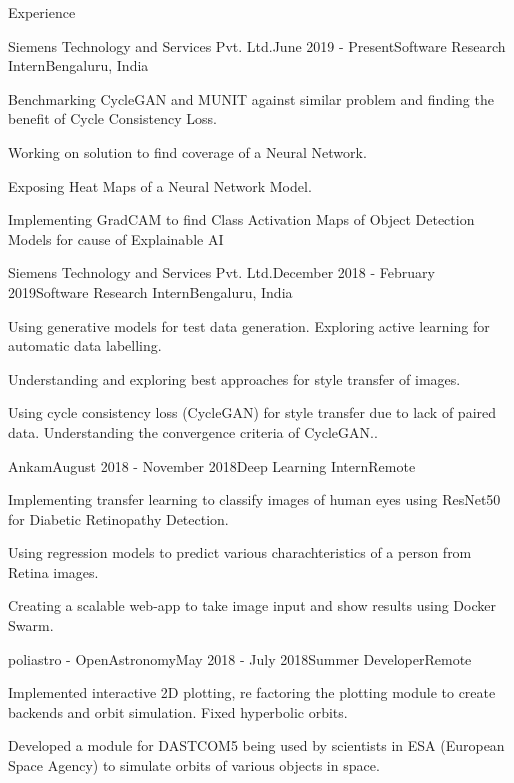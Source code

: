 \documentclass{resume} %
\begin{document}
\begin{rSection}{Experience}

\begin{rSubsection}{Siemens Technology and Services Pvt. Ltd.}{June 2019 - Present}{Software Research Intern}{Bengaluru, India}
\item Benchmarking CycleGAN and MUNIT against similar problem and finding the benefit of Cycle Consistency Loss.
\item Working on solution to find coverage of a Neural Network.
\item Exposing Heat Maps of a Neural Network Model.
\item Implementing GradCAM to find Class Activation Maps of Object Detection Models for cause of Explainable AI
\end{rSubsection}


\begin{rSubsection}{Siemens Technology and Services Pvt. Ltd.}{December 2018 - February 2019}{Software Research Intern}{Bengaluru, India}
\item Using generative models for test data generation. Exploring active learning
for automatic data labelling.
\item Understanding and exploring best approaches for style transfer of images.
\item Using cycle consistency loss (CycleGAN) for style transfer due to lack of paired data. Understanding the convergence criteria of CycleGAN..
\end{rSubsection}


\begin{rSubsection}{Ankam}{August 2018 - November 2018}{Deep Learning Intern}{Remote}
\item Implementing transfer learning to classify images of human eyes using
ResNet50 for Diabetic Retinopathy Detection.
\item Using regression models to predict various charachteristics of a person from Retina images. 
\item Creating a scalable web-app to take image input and show results using Docker Swarm.
\end{rSubsection}


\begin{rSubsection}{poliastro - OpenAstronomy}{May 2018 - July 2018}{Summer Developer}{Remote}
\item Implemented interactive 2D plotting, re factoring the plotting module to
create backends and orbit simulation. Fixed hyperbolic orbits.
\item Developed a module for DASTCOM5 being used by scientists in ESA (European Space Agency) to simulate orbits of various objects in space.
\end{rSubsection}

\end{rSection}
\end{document}
